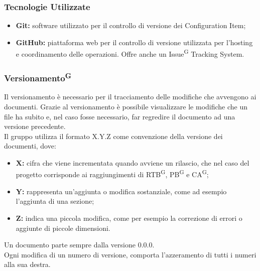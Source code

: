 \documentclass[8pt]{article}
\newcommand{\glossterm}[1]{#1\textsuperscript{G}} %
\begin{document}
\subsubsection{Tecnologie Utilizzate}

\begin{itemize}
    \item \textbf{Git:} software utilizzato per il controllo di versione dei Configuration Item;
    \item \textbf{GitHub:} piattaforma web per il controllo di versione utilizzata per l'hosting e coordinamento delle operazioni. Offre anche un \glossterm{Issue} Tracking System.
\end{itemize}

\subsubsection{\glossterm{Versionamento}}

Il versionamento è necessario per il tracciamento delle modifiche che avvengono ai documenti. Grazie al versionamento è possibile visualizzare le modifiche che un file ha subito e, nel caso fosse necessario, far regredire il documento ad una versione precedente. \\
Il gruppo utilizza il formato X.Y.Z come convenzione della versione dei documenti, dove:
\begin{itemize}
    \item \textbf{X:} cifra che viene incrementata quando avviene un rilascio, che nel caso del progetto corrisponde ai raggiungimenti di \glossterm{RTB}, \glossterm{PB} e \glossterm{CA};
    \item \textbf{Y:} rappresenta un'aggiunta o modifica sostanziale, come ad esempio l'aggiunta di una sezione;
    \item \textbf{Z:} indica una piccola modifica, come per esempio la correzione di errori o aggiunte di piccole dimensioni.
\end{itemize}
Un documento parte sempre dalla versione 0.0.0. \\
Ogni modifica di un numero di versione, comporta l'azzeramento di tutti i numeri alla sua destra.
\end{document}
